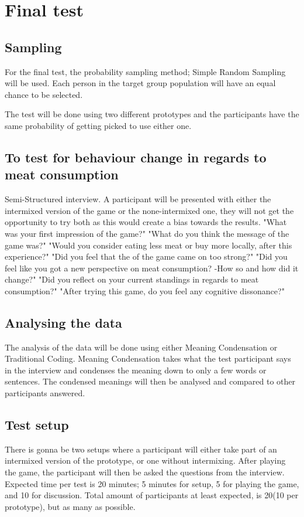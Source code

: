     \section{Final test}
     \subsection{Sampling}
     For the final test, the probability sampling method; Simple Random Sampling will be used\cite{bjoernerBog}. Each person in the target group population will have an equal chance to be selected. 
     
     The test will be done using two different prototypes and the participants have the same probability of getting picked to use either one. 
    
    \subsection{To test for behaviour change in regards to meat consumption}
    Semi-Structured interview\cite{bjoernerBog}. A participant will be presented with either the intermixed version of the game or the none-intermixed one, they will not get the opportunity to try both as this would create a bias towards the results.
    "What was your first impression of the game?"
    "What do you think the message of the game was?"
    "Would you consider eating less meat or buy more locally, after this experience?"
    "Did you feel that the of the game came on too strong?"
    "Did you feel like you got a new perspective on meat consumption? -How so and how did it change?"
    "Did you reflect on your current standings in regards to meat consumption?"
    "After trying this game, do you feel any cognitive dissonance?"
    
    \subsection{Analysing the data}
    The analysis of the data will be done using either Meaning Condensation or Traditional Coding\cite{bjoernerBog}. Meaning Condensation takes what the test participant says in the interview and condenses the meaning down to only a few words or sentences. The condensed meanings will then be analysed and compared to other participants answered. 
    
    \subsection{Test setup}
    There is gonna be two setups where a participant will either take part of an intermixed version of the prototype, or one without intermixing. After playing the game, the participant will then be asked the questions from the interview. Expected time per test is 20 minutes; 5 minutes for setup, 5 for playing the game, and 10 for discussion. Total amount of participants at least expected, is 20(10 per prototype), but as many as possible.